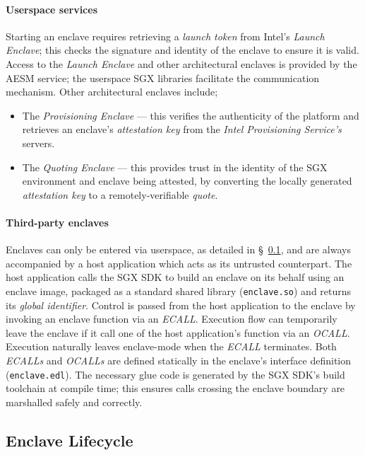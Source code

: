 \paragraph{Userspace services} Starting an enclave requires retrieving a \textit{launch token} from Intel's \textit{Launch Enclave}; this checks the signature and identity of the enclave to ensure it is valid. Access to the \textit{Launch Enclave} and other architectural enclaves is provided by the AESM service; the userspace SGX libraries facilitate the communication mechanism. Other architectural enclaves include;

\begin{itemize}
    \item The \textit{Provisioning Enclave} --- this verifies the authenticity of the platform and retrieves an enclave's \textit{attestation key} from the \textit{Intel Provisioning Service's} servers.
    \item The \textit{Quoting Enclave} --- this provides trust in the identity of the SGX environment and enclave being attested, by converting the locally generated \textit{attestation key} to a remotely-verifiable \textit{quote}.
\end{itemize}

\paragraph{Third-party enclaves} Enclaves can only be entered via userspace, as detailed in §~\ref{sec:sgx-lifecycle}, and are always accompanied by a host application which acts as its untrusted counterpart. The host application calls the SGX SDK to build an enclave on its behalf using an enclave image, packaged as a standard shared library (\texttt{enclave.so}) and returns its \textit{global identifier}. Control is passed from the host application to the enclave by invoking an enclave function via an \textit{ECALL}. Execution flow can temporarily leave the enclave if it call one of the host application's function via an \textit{OCALL}. Execution naturally leaves enclave-mode when the \textit{ECALL} terminates. Both \textit{ECALLs} and \textit{OCALLs} are defined statically in the enclave's interface definition (\texttt{enclave.edl}). The necessary glue code is generated by the SGX SDK's build toolchain at compile time; this ensures calls crossing the enclave boundary are marshalled safely and correctly.


\subsection{Enclave Lifecycle}
\label{sec:sgx-lifecycle}

